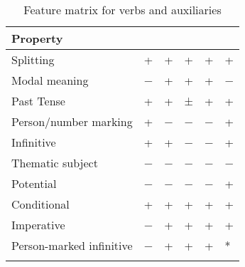 \documentclass[output=paper]{langsci/langscibook}
\begin{document}
\begin{table}
{\begin{tabularx}{\textwidth}{lXXXXX}
\textbf{Property}                &                               &                    &                             &                            &                                   \\
\midrule
Splitting                        & +                             & +                  & +                           & +                          &                                   +\\
Modal meaning                    & −                             & +                  & +                           & +                          &                                   −\\
Past Tense                       & +                             & +                  & ±                           & +                          &                                   +\\
Person/number marking    & +                             & −                  & −                           & −                          &                                   +\\
Infinitive                       & +                             & +                  & −                           & −                          &                                   +\\
Thematic subject                 & −                             & −                  & −                           & −                          &                                   −\\
Potential                        & −                             & −                  & −                           & −                          &                                   +\\
Conditional                      & +                             & +                  & +                           & +                          &                                   +\\
Imperative                       & −                             & +                  & +                           & +                          &                                   +\\
Person-marked infinitive & −                             & +                  & +                           & +                          &                                   *\\
\lspbottomrule
\end{tabularx}
}
\caption{Feature matrix for  verbs and auxiliaries}\label{tab:key:27.3}
\end{table}
\end{document}
